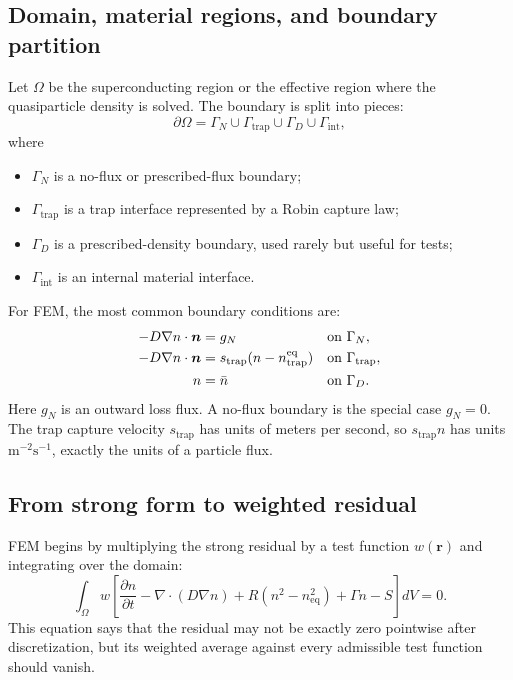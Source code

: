 \documentclass[11pt]{article}
\newcommand{\br}{{\bm{r}}}
\newcommand{\trap}{\mathrm{trap}}
\newcommand{\eq}{\mathrm{eq}}
\begin{document}
\subsection{Domain, material regions, and boundary partition}
Let $\Omega$ be the superconducting region or the effective region where the quasiparticle density is solved. The boundary is split into pieces:
\begin{equation}
\partial\Omega=\Gamma_N\cup\Gamma_{\trap}\cup\Gamma_D\cup\Gamma_{\mathrm{int}},
\end{equation}
where
\begin{itemize}[leftmargin=1.6em]
    \item $\Gamma_N$ is a no-flux or prescribed-flux boundary;
    \item $\Gamma_{\trap}$ is a trap interface represented by a Robin capture law;
    \item $\Gamma_D$ is a prescribed-density boundary, used rarely but useful for tests;
    \item $\Gamma_{\mathrm{int}}$ is an internal material interface.
\end{itemize}
For FEM, the most common boundary conditions are:
\begin{align}
-D\nabla n\cdot\nvec &= g_N &&\text{on }\Gamma_N,\label{eq:fem_qp_neumann}\\
-D\nabla n\cdot\nvec &= s_{\trap}(n-n_{\trap}^{\eq}) &&\text{on }\Gamma_{\trap},\label{eq:fem_qp_robin}\\
n&=\bar n &&\text{on }\Gamma_D.\label{eq:fem_qp_dirichlet}
\end{align}
Here $g_N$ is an outward loss flux. A no-flux boundary is the special case $g_N=0$. The trap capture velocity $s_{\trap}$ has units of meters per second, so $s_{\trap}n$ has units $\mathrm{m^{-2}s^{-1}}$, exactly the units of a particle flux.

\subsection{From strong form to weighted residual}
FEM begins by multiplying the strong residual by a test function $w(\br)$ and integrating over the domain:
\begin{equation}
\int_{\Omega}w\left[
\frac{\partial n}{\partial t}
-\nabla\cdot(D\nabla n)
+R(n^2-n_{\eq}^2)
+\Gamma n
-S
\right]dV=0.
\label{eq:fem_weighted_residual_before_parts}
\end{equation}
This equation says that the residual may not be exactly zero pointwise after discretization, but its weighted average against every admissible test function should vanish.
\end{document}
